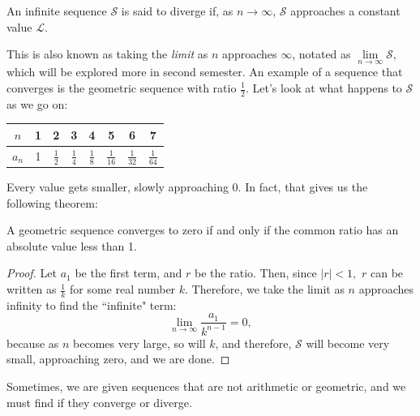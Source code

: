 \documentclass[11pt]{article}
\begin{document}
\begin{defn}
	An infinite sequence $\mathcal{S}$ is said to diverge if, as $n \rightarrow \infty$, $\mathcal{S}$ approaches a constant value $\mathcal{L}$.
\end{defn}
This is also known as taking the \textit{limit} as $n$ approaches $\infty$, notated as $\lim\limits_{n\rightarrow\infty}\mathcal{S},$ which will be explored more in second semester. An example of a sequence that converges is the geometric sequence with ratio $\frac{1}{2}$. Let's look at what happens to $\mathcal{S}$ as we go on:
\begin{center}
\begin{tabular}{c|c|c|c|c|c|c|c}
	$n$ & 1 & 2 & 3 &4 & 5 & 6 & 7 \\
	\hline
	$a_n$ & 1 & $\frac{1}{2}$ & $\frac{1}{4}$ & $\frac{1}{8}$ & $\frac{1}{16}$ & $\frac{1}{32}$ & $\frac{1}{64}$
\end{tabular}
\end{center}
Every value gets smaller, slowly approaching $0$. In fact, that gives us the following theorem:
\begin{thrm}
	A geometric sequence converges to zero if and only if the common ratio has an absolute value less than 1.
\end{thrm}
\begin{proof}
	Let $a_1$ be the first term, and $r$ be the ratio. Then, since $|r| < 1,$ $r$ can be written as $\frac{1}{k}$ for some real number $k$. Therefore, we take the limit as $n$ approaches infinity to find the ``infinite" term:
	\[\lim_{n\rightarrow\infty} \frac{a_1}{k^{n-1}} = 0,\]
	because as $n$ becomes very large, so will $k$, and therefore, $\mathcal{S}$ will become very small, approaching zero, and we are done.
\end{proof}

Sometimes, we are given sequences that are not arithmetic or geometric, and we must find if they converge or diverge.
\end{document}
